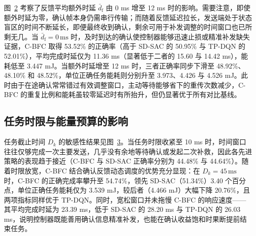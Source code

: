 \begin{figure}[!htb]
  \centering
  \label{rq3:fig:fading}
\end{figure}

图~\ref{rq3:fig:feedback} 考察了反馈平均额外时延 $\bar d_{\mathrm f}$ 由 0 ms 增至 12 ms 时的影响。需要注意，即使额外时延为零，确认帧本身仍需串行传输；而随着反馈延迟拉长，发送端处于状态盲区的时间不断延长，即便最终收到确认，剩余可用于补发调整的时间窗口也已所剩无几。当 $\bar d_{\mathrm f}=0\,\mathrm{ms}$ 时，及时到达的确认使控制器能够迅速止损或精准补发缺失证据，C-BFC 取得 53.52\% 的正确率（高于 SD-SAC 的 50.95\% 与 TP-DQN 的 52.01\%），平均完成时延仅为 11.36 ms（显著低于二者的 15.60 与 14.42 ms），能耗低至 3.447 mJ。当额外时延增至 12 ms 时，三者正确率同步下滑至 48.92\%、48.10\% 和 48.52\%，单位正确任务能耗则分别升至 3.973、4.426 与 4.526 mJ。此时由于在途确认常常错过有效调整窗口，主动等待能够省下的重传次数减少，C-BFC 的重复比例和能耗虽较零延迟时有所抬升，但仍显著优于所有对比基线。

\begin{figure}[!htb]
  \centering
  \label{rq3:fig:feedback}
\end{figure}

\FloatBarrier
\subsection{任务时限与能量预算的影响}
\label{rq3:subsec:deadline-results}
\label{rq3:subsec:energy-results}

任务截止时间 $D_k$ 的敏感性结果见图~\ref{rq3:fig:deadline}。当任务时限收紧至 10 ms 时，时间窗口往往仅够完成一次主要发送，几乎没有余地等待确认或发起二次补救，因此各先进策略的表现趋于接近（C-BFC 与 SD-SAC 正确率分别为 44.48\% 与 44.64\%）。随着时限放宽，C-BFC 结合确认反馈动态调度的优势充分显现：在 $D_k=45\,\mathrm{ms}$ 时，C-BFC 的正确完成率攀升至 54.74\%，领先 SD-SAC（51.34\%）3.40 个百分点，单位正确任务能耗仅为 3.539 mJ，较后者（4.466 mJ）大幅下降 20.76\%，且两项指标同样优于 TP-DQN。同时，宽松窗口并未拖慢 C-BFC 的响应速度——其平均完成时延为 23.39 ms，低于 SD-SAC 的 28.20 ms 与 TP-DQN 的 26.03 ms，说明控制器既能善用确认信息精准补发，也能在确认收益饱和时果断提前结束任务。

\begin{figure}[!htb]
  \centering
  \label{rq3:fig:deadline}
\end{figure}

